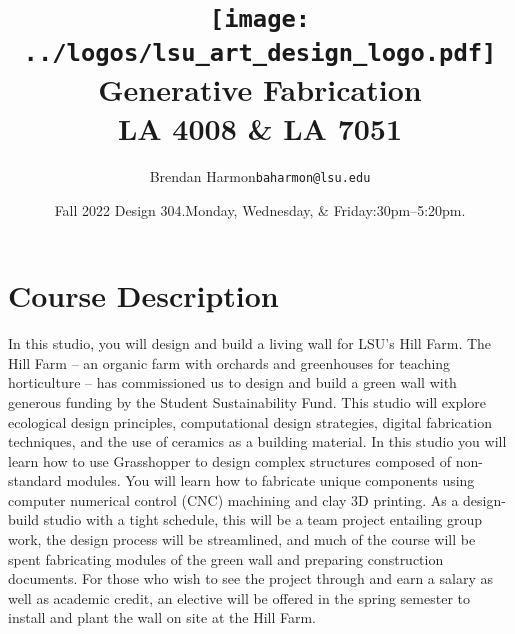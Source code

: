 \documentclass[11pt,article,oneside]{memoir}
\makeatletter
\def\myauthor{Author}
\def\mytitle{Title}
\def\myemail{baharmon@lsu.edu}
\def\myauthor{Brendan Harmon}
\def\mytitle{\texttt{[image: ../logos/lsu\_art\_design\_logo.pdf]}\\
[0.1cm]{\Large Generative Fabrication} \\ 
[-0.2cm]{\normalfont \normalsize LA 4008 \& LA 7051}}
\newcommand{\globalcolor}[1]{%
  \color{#1}\global\let\default@color\current@color
}
\makeatother
\begin{document}
\setlength\bibitemsep{0.5em}

\setmainfont{Lato Regular}
\setmonofont[Scale=0.8]{IBM Plex Mono}

\def\ind{\hangindent=1 true cm\hangafter=1 \noindent}
\def\labelitemi{$\cdot$}

\title{\LARGE \mytitle}
\author{\Large\myauthor \newline \footnotesize\texttt{\noindent\myemail}}
\date{Fall 2022 Design 304.\newline Monday, Wednesday, \& Friday:30pm--5:20pm.}
\published{\,}


\globalcolor{black}
\vspace*{-10em}
\maketitle
{}
\clearpage


\globalcolor{black}
\vspace*{-10em}
\maketitle

\section{Course Description}

In this studio, you will design and build
a living wall for LSU's Hill Farm.
The Hill Farm --
an organic farm with orchards and greenhouses
for teaching horticulture --
has commissioned us to design and build a green wall
with generous funding by the Student Sustainability Fund.
This studio will explore
ecological design principles,
computational design strategies,
digital fabrication techniques, and
the use of ceramics as a building material.
In this studio you will learn how to use Grasshopper
to design complex structures
composed of non-standard modules.
You will learn how to fabricate unique components
using computer numerical control (CNC) machining
and clay 3D printing.
As a design-build studio with a tight schedule,
this will be a team project entailing group work,
the design process will be streamlined,
and much of the course will be spent
fabricating modules of the green wall
and preparing construction documents.
For those who wish to see the project through
and earn a salary as well as academic credit,
an elective will be offered in the spring semester
to install and plant the wall on site at the Hill Farm.
\\
\end{document}

